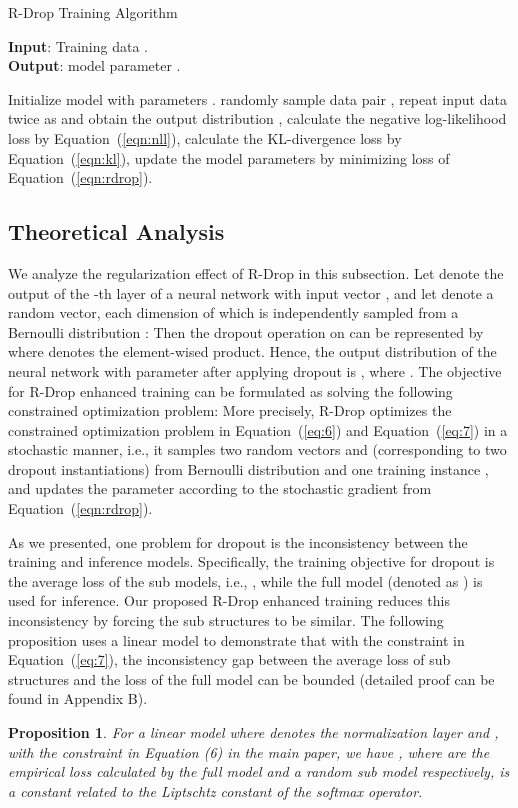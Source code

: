\documentclass{article}
\newtheorem{proposition}[theorem]{Proposition}
\begin{document}
\begin{algorithm}[!t]
\caption{R-Drop Training Algorithm}
\label{al:R-Drop}
\textbf{Input}: Training data . \\
\textbf{Output}: model parameter .

\begin{algorithmic}[1]
\STATE Initialize model with parameters .
\STATE randomly sample data pair ,
\STATE repeat input data twice as  and obtain the output distribution ,
\STATE calculate the negative log-likelihood loss  by Equation~(\ref{eqn:nll}),
\STATE calculate the KL-divergence loss  by Equation~(\ref{eqn:kl}),
\STATE update the model parameters by minimizing loss  of Equation~(\ref{eqn:rdrop}).
\ENDWHILE

\end{algorithmic}
\end{algorithm}


\subsection{Theoretical Analysis}
\label{sec:theoretical}

We analyze the regularization effect of R-Drop in this subsection. 
Let  denote the output of the -th layer of a neural network with input vector , and let  denote a random vector, each dimension of which is independently sampled from a Bernoulli distribution :
{\small}Then the dropout operation on  can be represented by {\small} where  denotes the element-wised product. Hence, the output distribution of the neural network with parameter  after applying dropout is , where .
The objective for R-Drop enhanced training can be formulated as solving the following constrained optimization problem: 
More precisely, R-Drop optimizes the constrained optimization problem in Equation~(\ref{eq:6}) and Equation~(\ref{eq:7}) in a stochastic manner, i.e., it samples two random vectors  and  (corresponding to two dropout instantiations) from Bernoulli distribution and one training instance , and updates the parameter  according to the stochastic gradient  from Equation~(\ref{eqn:rdrop}).


As we presented, one problem for dropout is the inconsistency between the training and inference models. Specifically, the training objective for dropout is the average loss of the sub models, i.e., , while the full model (denoted as ) is used for inference. Our proposed R-Drop enhanced training reduces this inconsistency by forcing the sub structures to be similar.
The following proposition uses a linear model to demonstrate that with the constraint in Equation~(\ref{eq:7}), the inconsistency gap between the average loss of sub structures and the loss of the full model can be bounded (detailed proof can be found in Appendix B).
\begin{proposition}
For a linear model  where  denotes the normalization layer and , with the constraint in Equation (6) in the main paper, we have , where  are the empirical loss calculated by the full model and a random sub model respectively,  is a constant related to the Liptschtz constant of the softmax operator.
\end{proposition}
\end{document}
